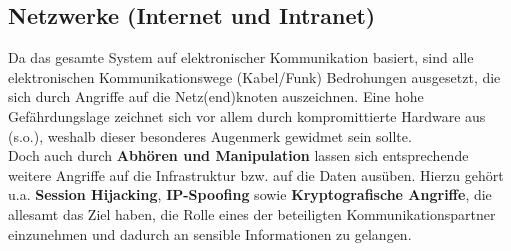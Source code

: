\subsection{Netzwerke (Internet und Intranet)}
Da das gesamte System auf elektronischer Kommunikation basiert, sind alle elektronischen Kommunikationswege (Kabel/Funk) Bedrohungen ausgesetzt, die sich durch Angriffe auf die Netz(end)knoten auszeichnen. Eine hohe Gefährdungslage zeichnet sich vor allem durch kompromittierte Hardware aus (s.o.), weshalb dieser besonderes Augenmerk gewidmet sein sollte.\\
Doch auch durch \textbf{Abhören und Manipulation} lassen sich entsprechende weitere Angriffe auf die Infrastruktur bzw. auf die Daten ausüben. Hierzu gehört u.a. \textbf{Session Hijacking}, \textbf{IP-Spoofing} sowie \textbf{Kryptografische Angriffe}, die allesamt das Ziel haben, die Rolle eines der beteiligten Kommunikationspartner einzunehmen und dadurch an sensible Informationen zu gelangen.
